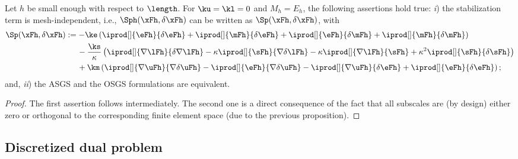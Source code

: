 \begin{proposition}
Let $h$ be small enough with respect to $\length$. For $\ku=\kl=0$ and $M_h = E_h$, the following assertions hold true: \textit{i}) the stabilization term is mesh-independent, i.e., $\Sph(\xFh,\delta\xFh)$ can be written as $\Sp(\xFh,\delta\xFh)$, with
\begin{align*}
\Sp(\xFh,\delta\xFh)
&:=-\ke\left(\iprod[]{\eFh}{\delta\eFh}+\iprod[]{\mFh}{\delta\eFh}+\iprod[]{\eFh}{\delta \mFh}+\iprod[]{\mFh}{\delta\mFh}\right)\\
&\quad\:\:-\frac{\ks}{\kappa}\left(\iprod[]{\nabla\lFh}{\delta\nabla\lFh}-\kappa\iprod[]{\sFh}{\nabla\delta\lFh}-\kappa\iprod[]{\nabla\lFh}{\sFh}+\kappa^2\iprod[]{\sFh}{\delta\sFh}\right)\\
&\quad\:\:+\km\left(\iprod[]{\nabla\uFh}{\nabla\delta\uFh}-
\iprod[]{\eFh}{\nabla\delta\uFh}-\iprod[]{\nabla\uFh}{\delta\eFh}+\iprod[]{\eFh}{\delta\eFh}\right); 
\end{align*}
and, \textit{ii}) the ASGS and the OSGS formulations are equivalent.
\end{proposition}
\begin{proof}
    The first assertion follows intermediately. The second one is a direct consequence of the fact that all subscales
    are (by design) either zero or orthogonal to the corresponding finite element space (due to the previous proposition).
\end{proof}

\subsection{Discretized dual problem}

